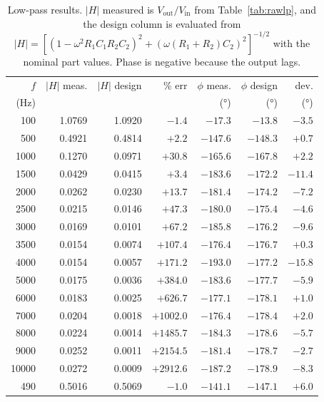 \documentclass[11pt]{article}
\begin{document}
\begin{table}[H]
    \centering\footnotesize
    \caption{Low-pass results. $|H|$ measured is $V_{\text{out}}/V_{\text{in}}$
    from Table~\ref{tab:rawlp}, and the design column is evaluated from
    $|H| = \left[(1-\omega^2R_1C_1R_2C_2)^2+(\omega(R_1+R_2)C_2)^2\right]^{-1/2}$
    with the nominal part values. Phase is negative because the output lags.}
    \label{tab:reslp}
    \begin{tabular}{r rrr rrr}
        \toprule
        $f$ & $|H|$ meas. & $|H|$ design & \% err &
        $\phi$ meas. & $\phi$ design & dev. \\
        (\unit{\hertz}) & & & & (\unit{\degree}) & (\unit{\degree}) & (\unit{\degree}) \\
        \midrule
          100 & 1.0769 & 1.0920 & $-1.4$ & $-17.3$ & $-13.8$ & $-3.5$ \\
          500 & 0.4921 & 0.4814 & $+2.2$ & $-147.6$ & $-148.3$ & $+0.7$ \\
         1000 & 0.1270 & 0.0971 & $+30.8$ & $-165.6$ & $-167.8$ & $+2.2$ \\
         1500 & 0.0429 & 0.0415 & $+3.4$ & $-183.6$ & $-172.2$ & $-11.4$ \\
         2000 & 0.0262 & 0.0230 & $+13.7$ & $-181.4$ & $-174.2$ & $-7.2$ \\
         2500 & 0.0215 & 0.0146 & $+47.3$ & $-180.0$ & $-175.4$ & $-4.6$ \\
         3000 & 0.0169 & 0.0101 & $+67.2$ & $-185.8$ & $-176.2$ & $-9.6$ \\
         3500 & 0.0154 & 0.0074 & $+107.4$ & $-176.4$ & $-176.7$ & $+0.3$ \\
         4000 & 0.0154 & 0.0057 & $+171.2$ & $-193.0$ & $-177.2$ & $-15.8$ \\
         5000 & 0.0175 & 0.0036 & $+384.0$ & $-183.6$ & $-177.7$ & $-5.9$ \\
         6000 & 0.0183 & 0.0025 & $+626.7$ & $-177.1$ & $-178.1$ & $+1.0$ \\
         7000 & 0.0204 & 0.0018 & $+1002.0$ & $-176.4$ & $-178.4$ & $+2.0$ \\
         8000 & 0.0224 & 0.0014 & $+1485.7$ & $-184.3$ & $-178.6$ & $-5.7$ \\
         9000 & 0.0252 & 0.0011 & $+2154.5$ & $-181.4$ & $-178.7$ & $-2.7$ \\
        10000 & 0.0272 & 0.0009 & $+2912.6$ & $-187.2$ & $-178.9$ & $-8.3$ \\
        \midrule
          490 & 0.5016 & 0.5069 & $-1.0$ & $-141.1$ & $-147.1$ & $+6.0$ \\
        \bottomrule
    \end{tabular}
\end{table}
\end{document}
